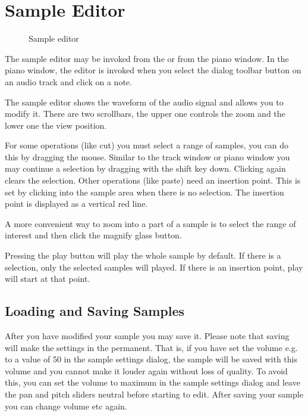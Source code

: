 \documentclass[letterpaper]{report}
\begin{document}
\section{Sample Editor}\label{samplewin}

\begin{figure}%
%
%
\caption{Sample editor}%
\end{figure}

The sample editor may be invoked from the
 or from the piano window.
In the piano window, the editor is invoked when you select the dialog
toolbar button on an audio track and click on a note.

The sample editor shows the waveform of the audio signal and allows
you to modify it. There are two scrollbars, the upper one controls the
zoom and the lower one the view position.

For some operations (like cut) you must select a range of samples, you
can do this by dragging the mouse. Similar to the track window or piano
window you may continue a selection by dragging with the shift key down.
Clicking again clears the selection. Other operations (like paste) need
an insertion point. This is set by clicking into the sample area when
there is no selection. The insertion point is displayed as a vertical
red line.

A more convenient way to zoom into a part of a sample is to select
the range of interest and then click the magnify glass button.

Pressing the play button will play the whole sample by default. If there
is a selection, only the selected samples will played. If there is
an insertion point, play will start at that point.



\subsection{Loading and Saving Samples}

After you have modified your sample you may save it. Please note that
saving will make the settings in the  permanent. That is, if you have set the volume
e.g. to a value of 50 in the sample settings dialog, the sample will be
saved with this volume and you cannot make it louder again without loss
of quality. To avoid this, you can set the volume to maximum in the
sample settings dialog and leave the pan and pitch sliders neutral before
starting to edit. After saving your sample you can change volume etc again.
\end{document}

